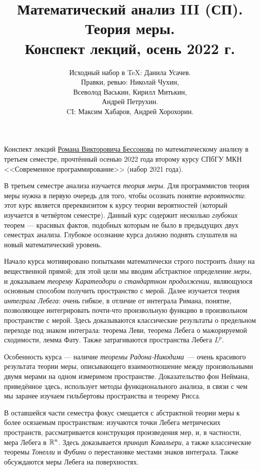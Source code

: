 \documentclass[a4paper,14pt]{extarticle}
\title{Математический анализ III (СП). \\ Теория меры. \\ Конспект лекций, осень 2022 г.}
\author{Исходный набор в \TeX: Данила Усачев. \\ Правки, ревью: Николай Чухин, \\ Всеволод Васькин, Кирилл Митькин, \\ Андрей Петрухин. \\ CI: Максим Хабаров, Андрей Хорохорин.}
\date{}
\theoremstyle{definition}
\theoremstyle{plain}
\theoremstyle{plain}
\theoremstyle{plain}
\theoremstyle{plain}
\theoremstyle{definition}
\theoremstyle{definition}
\theoremstyle{definition}
\theoremstyle{definition}
\theoremstyle{definition}
\theoremstyle{definition}
\theoremstyle{definition}
\theoremstyle{definition}
\theoremstyle{definition}
\theoremstyle{plain}
\theoremstyle{plain}
\theoremstyle{plain}
\theoremstyle{plain}
\theoremstyle{definition}
\theoremstyle{definition}
\theoremstyle{definition}
\theoremstyle{definition}
\theoremstyle{definition}
\theoremstyle{definition}
\newcommand{\R}{\ensuremath \mathbb{R}}
\begin{document}
\maketitle
\maketitle
Конспект лекций \href{https://math-cs.spbu.ru/people/bessonov-r-v/}{\color{blue}Романа Викторовича Бессонова} по математическому анализу в третьем семестре, прочтённый осенью 2022 года второму курсу СПбГУ МКН <<Современное программирование>> (набор 2021 года).

В третьем семестре анализа изучается \emph{теория меры}. Для программистов теория меры нужна в первую очередь для того, чтобы осознать понятие \textit{вероятности}: этот курс является пререквизитом к курсу теории вероятностей (который изучается в четвёртом семестре). Данный курс содержит несколько \textit{глубоких} теорем --- красивых фактов, подобных которым не было в предыдущих двух семестрах анализа. Глубокое осознание курса должно поднять слушателя на новый математический уровень.

Начало курса мотивировано попытками математически строго построить \emph{длину} на вещественной прямой; для этой цели мы вводим абстрактное определение \emph{меры}, и доказываем \emph{теорему Каратеодори о стандартном продолжении}, являющуюся основным способом получить пространство с мерой. Далее изучается теория \emph{интеграла Лебега}: очень гибкое, в отличие от интеграла Римана, понятие, позволяющее интегрировать почти-что произвольную функцию в произвольном пространстве с мерой. Здесь доказываются классические результаты о предельном переходе под знаком интеграла: теорема Леви, теорема Лебега о мажорируемой сходимости, лемма Фату. Также затрагиваются пространства Лебега $ L^{p} $.

Особенность курса --- наличие \emph{теоремы Радона-Никодима}~--- очень красивого результата теории меры, описывающего взаимоотношение между произвольными двумя мерами на одном измеримом пространстве. Доказательство фон Неймана, приведённое здесь, использует методы функционального анализа, в связи с чем мы заранее изучаем гильбертовы пространства и теорему Рисса.

В оставшейся части семестра фокус смещается с абстрактной теории меры к более осязаемым пространствам: изучаются точки Лебега метрических пространств, рассматривается конструкция произведения мер, и, в частности, мера Лебега в $ \R^{n} $. Здесь доказывается \emph{принцип Кавальери}, а также классические теоремы \emph{Тонелли} и \emph{Фубини} о перестановке местами знаков интеграла. Также обсуждаются меры Лебега на поверхностях.
\end{document}
